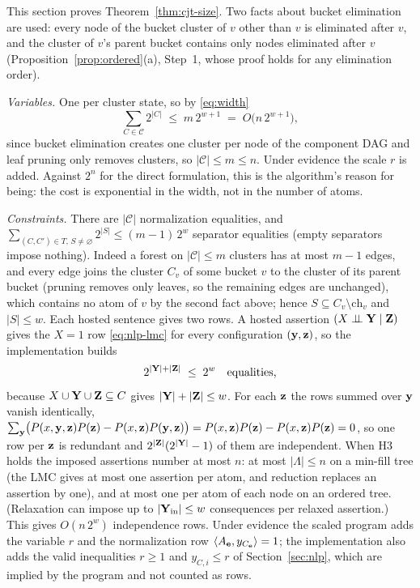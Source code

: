 \documentclass{article} %
\newcommand{\indep}{\perp\!\!\!\perp}
\newcommand{\ch}{\mathrm{ch}}
\begin{document}
This section proves Theorem~\ref{thm:cjt-size}. Two facts about bucket
elimination are used: every node of the bucket cluster of $v$ other than $v$ is
eliminated after $v$, and the cluster of $v$'s parent bucket contains only nodes
eliminated after $v$ (Proposition~\ref{prop:ordered}(a), Step~1, whose proof
holds for any elimination order).

\emph{Variables.} One per cluster state, so by \eqref{eq:width}
\begin{equation}\label{eq:cost}
  \sum_{C\in\mathcal C}2^{|C|}\;\le\;m\,2^{w+1}\;=\;O\!\bigl(n\,2^{w+1}\bigr),
\end{equation}
since bucket elimination creates one cluster per node of the component
DAG and leaf pruning only removes clusters, so $|\mathcal C|\le m\le n$. Under
evidence the scale $r$ is added. Against $2^n$ for the direct formulation, this is
the algorithm's reason for being: the cost is exponential in the width, not in the
number of atoms.

\emph{Constraints.} There are $|\mathcal C|$ normalization equalities, and
$\sum_{(C,C')\in T,\,S\ne\varnothing}2^{|S|}\le(m-1)\,2^{w}$ separator equalities
(empty separators impose nothing). Indeed a forest on $|\mathcal C|\le m$ clusters
has at most $m-1$ edges, and every edge joins the cluster $C_v$ of some bucket $v$
to the cluster of its parent bucket (pruning removes only leaves, so the remaining
edges are unchanged), which contains no atom of $v$ by the second fact above;
hence $S\subseteq C_v\setminus\ch_v$ and $|S|\le w$. Each hosted sentence gives two
rows. A hosted assertion $(X\indep \bY\mid \bZ)$ gives the $X{=}1$ row
\eqref{eq:nlp-lmc} for every configuration $(\mathbf{y},\mathbf{z})$, so the implementation
builds
\begin{equation}\label{eq:lmcrows}
  2^{|\mathbf{Y}|+|\mathbf{Z}|}\;\le\;2^{w}\quad\text{equalities,}
\end{equation}
because $X\cup\mathbf{Y}\cup\mathbf{Z}\subseteq C$ gives $|\mathbf{Y}|+|\mathbf{Z}|\le w$. For each $\mathbf{z}$ the
rows summed over $\mathbf{y}$ vanish identically,
$\sum_{\mathbf{y}}\bigl(P(x,\mathbf{y},\mathbf{z})P(\mathbf{z})-P(x,\mathbf{z})P(\mathbf{y},\mathbf{z})\bigr)=P(x,\mathbf{z})P(\mathbf{z})-P(x,\mathbf{z})P(\mathbf{z})=0$,
so one row per $\mathbf{z}$ is redundant and $2^{|\mathbf{Z}|}(2^{|\mathbf{Y}|}-1)$ of them are
independent. When H3 holds the imposed assertions number at most $n$: at most
$|\Lambda|\le n$ on a min-fill tree (the LMC gives at most one assertion per atom,
and reduction replaces an assertion by one), and at most one per atom of each node
on an ordered tree. (Relaxation can impose up to $|\mathbf{Y}_{\mathrm{in}}|\le w$
consequences per relaxed assertion.) This gives $O(n\,2^{w})$ independence rows.
Under evidence the scaled program adds the variable $r$ and the normalization row
$\langle A_{\mathbf{e}},y_{C_{\mathbf{e}}}\rangle=1$; the implementation also adds the valid
inequalities $r\ge1$ and $y_{C,i}\le r$ of Section~\ref{sec:nlp}, which are implied
by the program and not counted as rows.
\end{document}
